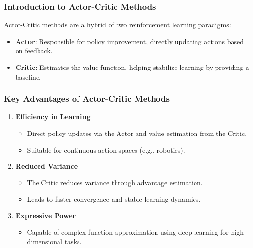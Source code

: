 \documentclass{beamer}
\begin{document}
\begin{frame}[fragile]
    \frametitle{Introduction to Actor-Critic Methods}
    Actor-Critic methods are a hybrid of two reinforcement learning paradigms:
    \begin{itemize}
        \item \textbf{Actor}: Responsible for policy improvement, directly updating actions based on feedback.
        \item \textbf{Critic}: Estimates the value function, helping stabilize learning by providing a baseline.
    \end{itemize}
\end{frame}

\begin{frame}[fragile]
    \frametitle{Key Advantages of Actor-Critic Methods}
    \begin{enumerate}
        \item \textbf{Efficiency in Learning}
            \begin{itemize}
                \item Direct policy updates via the Actor and value estimation from the Critic.
                \item Suitable for continuous action spaces (e.g., robotics).
            \end{itemize}
        \item \textbf{Reduced Variance}
            \begin{itemize}
                \item The Critic reduces variance through advantage estimation.
                \item Leads to faster convergence and stable learning dynamics.
            \end{itemize}
        \item \textbf{Expressive Power}
            \begin{itemize}
                \item Capable of complex function approximation using deep learning for high-dimensional tasks.
            \end{itemize}
    \end{enumerate}
\end{frame}
\end{document}
